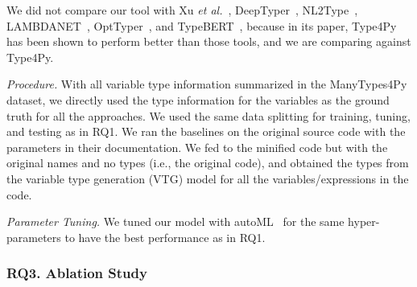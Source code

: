 
We did not compare our tool with Xu {\em et al.}~\cite{xu-fse16},
DeepTyper~\cite{DeepTyper-fse18}, NL2Type~\cite{nl2type-icse19},
LAMBDANET~\cite{LambdaNet-iclr20}, OptTyper~\cite{optyper20}, and
TypeBERT~\cite{typeBERT-fse21}, because in its paper, Type4Py has been
shown to perform better than those tools, and we are comparing against
Type4Py.


\textit{Procedure.}  With all variable type information summarized in
the ManyTypes4Py dataset, we directly used the type information for
the variables as the ground truth for all the approaches. We used the
same data splitting for training, tuning, and testing as in RQ1. We
ran the baselines on the original source code with the parameters in
their documentation. We fed to {\tool} the minified code but with the
original names and no types (i.e., the original code), and obtained
the types from the variable type generation (VTG) model for all the
variables/expressions in the code.


{\em Parameter Tuning.} We tuned our model with
autoML~\cite{NNI} for the same hyper-parameters to have the best
performance as in RQ1. 


\subsubsection{RQ3. Ablation Study}

